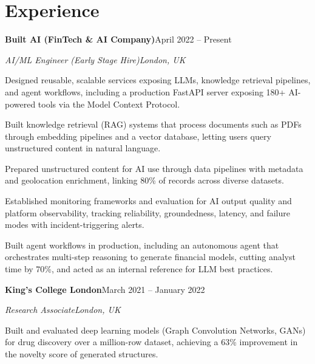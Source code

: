 \documentclass[10pt,a4paper]{article}
\newcommand{\entry}[4]{%
  {\color{company}\bfseries #1}\hfill {\color{muted}#2}\par
  \vspace{1pt}
  {\itshape #3}\hfill {\color{muted}\itshape #4}\par
  \vspace{3pt}%
}
\begin{document}
\section{Experience}
\entry{Built AI (FinTech \& AI Company)}{April 2022 -- Present}{AI/ML Engineer (Early Stage Hire)}{London, UK}
\begin{tight}
  \item Designed reusable, scalable services exposing LLMs, knowledge retrieval pipelines, and agent workflows, including a production FastAPI server exposing 180+ AI-powered tools via the Model Context Protocol.
  \item Built knowledge retrieval (RAG) systems that process documents such as PDFs through embedding pipelines and a vector database, letting users query unstructured content in natural language.
  \item Prepared unstructured content for AI use through data pipelines with metadata and geolocation enrichment, linking 80\% of records across diverse datasets.
  \item Established monitoring frameworks and evaluation for AI output quality and platform observability, tracking reliability, groundedness, latency, and failure modes with incident-triggering alerts.
  \item Built agent workflows in production, including an autonomous agent that orchestrates multi-step reasoning to generate financial models, cutting analyst time by 70\%, and acted as an internal reference for LLM best practices.
\end{tight}

\entry{King's College London}{March 2021 -- January 2022}{Research Associate}{London, UK}
\begin{tight}
  \item Built and evaluated deep learning models (Graph Convolution Networks, GANs) for drug discovery over a million-row dataset, achieving a 63\% improvement in the novelty score of generated structures.
\end{tight}

\end{document}
